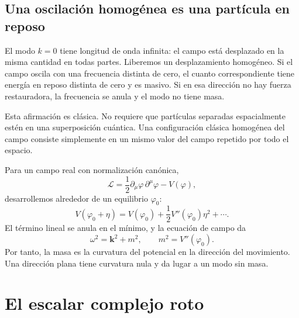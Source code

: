 \subsection{Una oscilación homogénea es una partícula en reposo}

El modo \(k=0\) tiene longitud de onda infinita: el campo está desplazado en la misma cantidad en todas partes. Liberemos un desplazamiento homogéneo. Si el campo oscila con una frecuencia distinta de cero, el cuanto correspondiente tiene energía en reposo distinta de cero y es masivo. Si en esa dirección no hay fuerza restauradora, la frecuencia se anula y el modo no tiene masa.

Esta afirmación es clásica. No requiere que partículas separadas espacialmente estén en una superposición cuántica. Una configuración clásica homogénea del campo consiste simplemente en un mismo valor del campo repetido por todo el espacio.

\begin{classroomqa}
\end{classroomqa}

Para un campo real con normalización canónica,
\begin{equation}
  \mathcal L
  =\frac12\partial_\mu\varphi\,\partial^\mu\varphi-V(\varphi),
\end{equation}
desarrollemos alrededor de un equilibrio \(\varphi_0\):
\begin{equation}
  V(\varphi_0+\eta)
  =V(\varphi_0)
   +\frac12V''(\varphi_0)\eta^2+\cdots.
\end{equation}
El término lineal se anula en el mínimo, y la ecuación de campo da
\begin{equation}
  \omega^2=\bm{k}^2+m^2,
  \qquad
  m^2=V''(\varphi_0).
  \label{eq:l08-curvature-mass}
\end{equation}
Por tanto, la masa es la curvatura del potencial en la dirección del movimiento. Una dirección plana tiene curvatura nula y da lugar a un modo sin masa.

\section{El escalar complejo roto}

